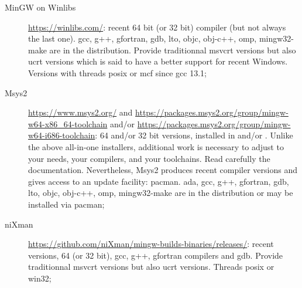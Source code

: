 \begin{description}
\item[MinGW on Winlibs] \url{https://winlibs.com/}: recent 64 bit (or 32 bit) compiler (but not always the last one). gcc, g++, gfortran, gdb, lto, objc, obj-c++, omp, mingw32-make are in the distribution. Provide traditionnal msvcrt versions but also ucrt versions which is said to have a better support for recent Windows. Versions with threads posix or mcf since gcc 13.1;
\item[Msys2] \url{https://www.msys2.org/} and \url{https://packages.msys2.org/group/mingw-w64-x86_64-toolchain} and/or \url{https://packages.msys2.org/group/mingw-w64-i686-toolchain}: 64 and/or 32 bit versions, installed in  and/or . Unlike the above all-in-one installers, additional work is necessary to adjust to your needs, your compilers, and your toolchains. Read carefully the documentation. Nevertheless, Msys2 produces recent compiler versions and gives access to an update facility: pacman. ada, gcc, g++, gfortran, gdb, lto, objc, obj-c++, omp, mingw32-make are in the distribution or may be installed via pacman;
\item[niXman] \url{https://github.com/niXman/mingw-builds-binaries/releases/}: recent versions, 64 (or 32 bit), gcc, g++, gfortran compilers and gdb. Provide traditionnal msvcrt versions but also ucrt versions. Threads posix or win32;
\end{description}

